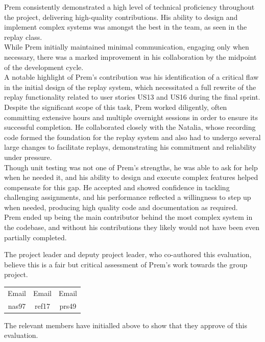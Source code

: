 \documentclass[a4paper]{project}
\begin{document}
			Prem consistently demonstrated a high level of technical proficiency throughout the project, delivering high-quality contributions. His ability to design and implement complex systems was amongst the best in the team, as seen in the replay class. \\
			While Prem initially maintained minimal communication, engaging only when necessary, there was a marked improvement in his collaboration by the midpoint of the development cycle. \\
			A notable highlight of Prem’s contribution was his identification of a critical flaw in the initial design of the replay system, which necessitated a full rewrite of the replay functionality related to user stories US13 and US16 during the final sprint. Despite the significant scope of this task, Prem worked diligently, often committing extensive hours and multiple overnight sessions in order to ensure its successful completion. He collaborated closely with the Natalia, whose recording code formed the foundation for the replay system and also had to undergo several large changes to facilitate replays, demonstrating his commitment and reliability under pressure. \\
			Though unit testing was not one of Prem’s strengths, he was able to ask for help when he needed it, and his ability to design and execute complex features helped compensate for this gap. He accepted and showed confidence in tackling challenging assignments, and his performance reflected a willingness to step up when needed, producing high quality code and documentation as required. \\
			Prem ended up being the main contributor behind the most complex system in the codebase, and without his contributions they likely would not have been even partially completed.
		
			The project leader and deputy project leader, who co-authored this evaluation, believe this is a fair but critical assessment of Prem's work towards the group project.
			
			\begin{center}
				\setlength{\tabcolsep}{0.05\paperwidth}
				\begin{tabular}{c c c}
					Email & Email & Email  \\
					nas97 & ref17 & prs49
				\end{tabular}
			\end{center}
			
			The relevant members have initialled above to show that they approve of this evaluation.
		
\end{document}
